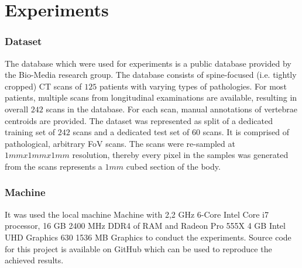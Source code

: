 \chapter{Experiments}
\label{ch:experiments}

\subsection{Dataset}
The database which were used for experiments is a public database provided by the Bio-Media research group. The database consists of spine-focused (i.e. tightly cropped) CT scans of $125$ patients with varying types of pathologies. For most patients, multiple scans from longitudinal examinations are available, resulting in overall $242$ scans in the database. For each scan, manual annotations of vertebrae centroids are provided. The dataset was represented as split of a dedicated training set of $242$ scans and a dedicated test set of $60$ scans. It is comprised of pathological, arbitrary FoV scans. The scans were re-sampled at $1mm x 1mm x 1mm$ resolution, thereby every pixel in the samples was generated from the scans represents a $1mm$ cubed section of the body.

\subsection{Machine}
It was used the local machine Machine with 2,2 GHz 6-Core Intel Core i7 processor, 16 GB 2400 MHz DDR4 of RAM and Radeon Pro 555X 4 GB
Intel UHD Graphics 630 1536 MB Graphics to conduct the experiments. Source code for this project is available on GitHub which can be used to reproduce the achieved results.

